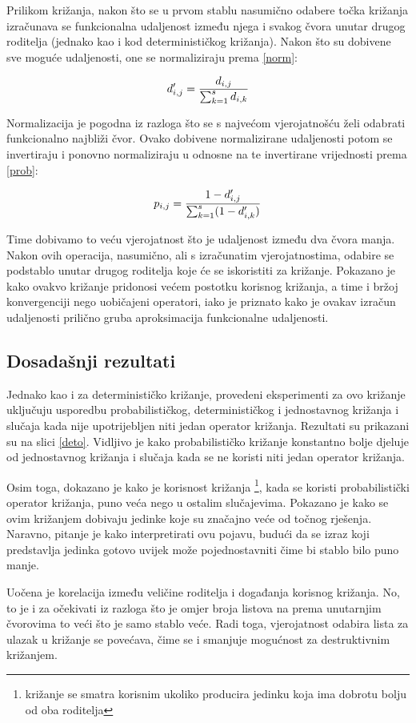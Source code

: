 Prilikom križanja, nakon što se u prvom stablu nasumično odabere točka križanja izračunava se funkcionalna udaljenost između njega i svakog čvora unutar drugog roditelja (jednako kao i kod determinističkog križanja). Nakon što su dobivene sve moguće udaljenosti, one se normaliziraju prema \ref{norm}:

\begin{equation} 
\label{norm}
 \large{ d '_{i,j} = \frac{d_{i,j}}{\sum_{k=1}^{s} d_{i,k}} }
\end{equation}
 
Normalizacija je pogodna iz razloga što se s najvećom vjerojatnošću želi odabrati funkcionalno najbliži čvor. Ovako dobivene normalizirane udaljenosti potom se invertiraju i ponovno normaliziraju u odnosne na te invertirane vrijednosti prema \ref{prob}:
 
 \begin{equation} 
\label{prob}
 \large{ p_{i,j} = \frac{1 - d '_{i,j}}{\sum_{k=1}^{s} (1 - d '_{i,k})} }
\end{equation}

Time dobivamo to veću vjerojatnost što je udaljenost između dva čvora manja. Nakon ovih operacija, nasumično, ali s izračunatim vjerojatnostima, odabire se podstablo unutar drugog roditelja koje će se iskoristiti za križanje. Pokazano je kako ovakvo križanje pridonosi većem postotku korisnog križanja, a time i bržoj konvergenciji nego uobičajeni operatori, iako je priznato kako je ovakav izračun udaljenosti prilično gruba aproksimacija funkcionalne udaljenosti.

\subsection{Dosadašnji rezultati}
Jednako kao i za determinističko križanje, provedeni eksperimenti za ovo križanje uključuju usporedbu probabilističkog, determinističkog i jednostavnog križanja i slučaja kada nije upotrijebljen niti jedan operator križanja. Rezultati su prikazani su na slici \ref{deto}. Vidljivo je kako probabilističko križanje konstantno bolje djeluje od jednostavnog križanja i slučaja kada se ne koristi niti jedan operator križanja.

Osim toga, dokazano je kako je korisnost križanja \footnote{križanje se smatra korisnim ukoliko producira jedinku koja ima dobrotu bolju od oba roditelja}, kada se koristi probabilistički operator križanja, puno veća nego u ostalim slučajevima. Pokazano je kako se ovim križanjem dobivaju jedinke koje su značajno veće od točnog rješenja. Naravno, pitanje je kako interpretirati ovu pojavu, budući da se izraz koji predstavlja jedinka gotovo uvijek može pojednostavniti čime bi stablo bilo puno manje.

Uočena je korelacija između veličine roditelja i događanja korisnog križanja. No, to je i za očekivati iz razloga što je omjer broja listova na prema unutarnjim čvorovima to veći što je samo stablo veće. Radi toga, vjerojatnost odabira lista za ulazak u križanje se povećava, čime se i smanjuje mogućnost za destruktivnim križanjem. 